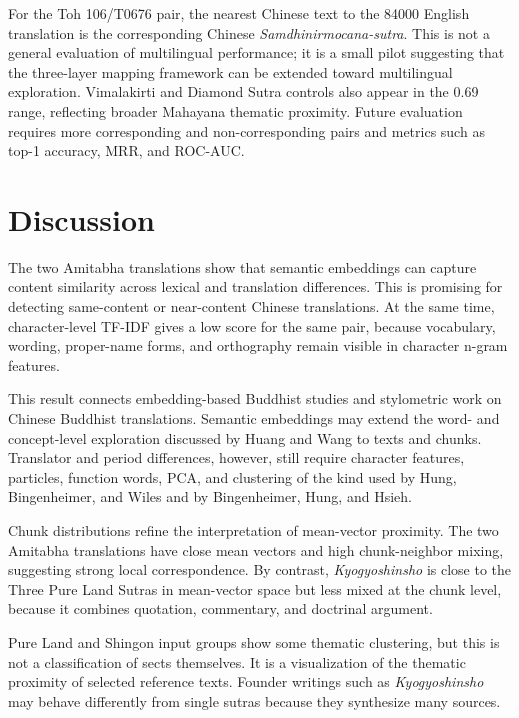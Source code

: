 \documentclass[uplatex,dvipdfmx,11pt,a4paper]{jsarticle}
\begin{document}
For the Toh 106/T0676 pair, the nearest Chinese text to the 84000 English translation is the corresponding Chinese \textit{Samdhinirmocana-sutra}. This is not a general evaluation of multilingual performance; it is a small pilot suggesting that the three-layer mapping framework can be extended toward multilingual exploration. Vimalakirti and Diamond Sutra controls also appear in the 0.69 range, reflecting broader Mahayana thematic proximity. Future evaluation requires more corresponding and non-corresponding pairs and metrics such as top-1 accuracy, MRR, and ROC-AUC.

\section{Discussion}

The two Amitabha translations show that semantic embeddings can capture content similarity across lexical and translation differences. This is promising for detecting same-content or near-content Chinese translations. At the same time, character-level TF-IDF gives a low score for the same pair, because vocabulary, wording, proper-name forms, and orthography remain visible in character n-gram features.

This result connects embedding-based Buddhist studies and stylometric work on Chinese Buddhist translations. Semantic embeddings may extend the word- and concept-level exploration discussed by Huang and Wang\cite{huang2023} to texts and chunks. Translator and period differences, however, still require character features, particles, function words, PCA, and clustering of the kind used by Hung, Bingenheimer, and Wiles and by Bingenheimer, Hung, and Hsieh\cite{hung2010,bingenheimer2017}.

Chunk distributions refine the interpretation of mean-vector proximity. The two Amitabha translations have close mean vectors and high chunk-neighbor mixing, suggesting strong local correspondence. By contrast, \textit{Kyogyoshinsho} is close to the Three Pure Land Sutras in mean-vector space but less mixed at the chunk level, because it combines quotation, commentary, and doctrinal argument.

Pure Land and Shingon input groups show some thematic clustering, but this is not a classification of sects themselves. It is a visualization of the thematic proximity of selected reference texts. Founder writings such as \textit{Kyogyoshinsho} may behave differently from single sutras because they synthesize many sources.
\end{document}
